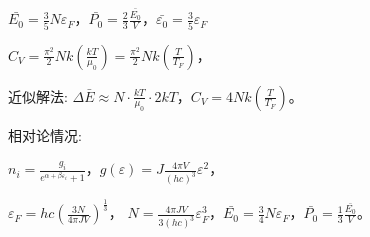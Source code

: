 \documentclass[a4paper,8pt]{extarticle} %
\begin{document}
\begin{multicols}{3}
$\bar{E_0} = \frac{3}{5}N\varepsilon_F$，$\bar{P_0} = \frac{2}{3}\frac{\bar{E_0}}{V}$，$\bar{\varepsilon_0} = \frac{3}{5}\varepsilon_F$

$C_V = \frac{\pi^2}{2}Nk\left(\frac{kT}{\mu_0}\right) = \frac{\pi^2}{2}Nk\left(\frac{T}{T_F}\right)$，

近似解法: $\Delta\bar{E} \approx N\cdot\frac{kT}{\mu_0}\cdot 2kT$，$C_V = 4Nk\left(\frac{T}{T_F}\right)$。

相对论情况:

$n_i = \frac{g_i}{e^{\alpha+\beta\varepsilon_i}+1}$，$g(\varepsilon) = J\frac{4\pi V}{(hc)^3}\varepsilon^2$，

$\varepsilon_F = hc\left(\frac{3N}{4\pi JV}\right)^{\frac{1}{3}}$，
$N = \frac{4\pi JV}{3(hc)^3}\varepsilon_F^3$，$\bar{E_0} = \frac{3}{4}N\varepsilon_F$，$\bar{P_0} = \frac{1}{3}\frac{\bar{E_0}}{V}$。
\end{multicols}
\end{document}
